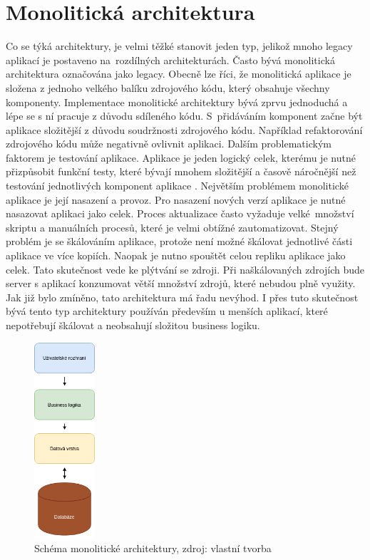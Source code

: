 \section{Monolitická architektura}
Co se týká architektury, je velmi těžké stanovit jeden typ, jelikož mnoho legacy aplikací je postaveno na rozdílných architekturách. Často bývá monolitická architektura označována jako legacy. Obecně lze říci, že monolitická aplikace je složena z jednoho velkého balíku zdrojového kódu, který obsahuje všechny komponenty. Implementace monolitické architektury bývá zprvu jednoduchá a lépe se s ní pracuje z důvodu sdíleného kódu. S přidáváním komponent začne být aplikace složitější z důvodu soudržnosti zdrojového kódu. Například refaktorování zdrojového kódu může negativně ovlivnit aplikaci. Dalším problematickým faktorem je testování aplikace. Aplikace je jeden logický celek, kterému je nutné přizpůsobit funkční testy, které bývají mnohem složitější a časově náročnější než testování jednotlivých komponent aplikace \cite{legacy_testing}. Největším problémem monolitické aplikace je její nasazení a provoz. Pro nasazení nových verzí aplikace je nutné nasazovat aplikaci jako celek. Proces aktualizace často vyžaduje velké množství skriptu a manuálních procesů, které je velmi obtížné zautomatizovat. Stejný problém je se škálováním aplikace, protože není možné škálovat jednotlivé části aplikace ve více kopiích. Naopak je nutno spouštět celou repliku aplikace jako celek. Tato skutečnost vede ke plýtvání se zdroji. Při naškálovaných zdrojích bude server s aplikací konzumovat větší množství zdrojů, které nebudou plně využity. Jak již bylo zmíněno, tato architektura má řadu nevýhod. I přes tuto skutečnost bývá tento typ architektury používán především u menších aplikací, které nepotřebují škálovat a neobsahují složitou business logiku.

\begin{figure}[H]
\begin{centering}
\includegraphics[width=0.2\textwidth]{img/monolit.png}
\par\end{centering}
\caption{Schéma monolitické architektury, zdroj: vlastní tvorba} \label{fig:monolit}
\end{figure}

